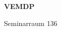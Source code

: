 \documentclass[a4paper]{article}
\begin{document}
\printGenericVSLHeader
\begin{center}
\begin{vsltext}{3cm}{4cm}

   \vspace{0.5cm} 

    \textbf{VEMDP} 

    \vspace{1.5cm}

    Seminarraum 136

\end{vsltext}

\end{center}
\end{document}
